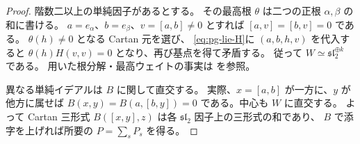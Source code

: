 \begin{proof}
階数二以上の単純因子があるとする。
その最高根 $\theta$ は二つの正根 $\alpha,\beta$ の和に書ける。
$a=e_\alpha$、$b=e_\beta$、$v=[a,b]\neq0$ とすれば
$[a,v]=[b,v]=0$ である。
$\theta(h)\neq0$ となる Cartan 元を選び、
\eqref{eq:pg-lie-H}に $(a,b,h,v)$ を代入すると
$\theta(h)H(v,v)=0$ となり、再び基点を得て矛盾する。
従って $W\simeq\mathfrak{sl}_2^{\oplus k}$ である。
用いた根分解・最高ウェイトの事実は
\cite[\S19.4, Theorem 25.17, \S32.2]{PEtingofLie}を参照。

異なる単純イデアルは $B$ に関して直交する。
実際、$x=[a,b]$ が一方に、$y$ が他方に属せば
$B(x,y)=B(a,[b,y])=0$ である。中心も $W$ に直交する。
よって Cartan 三形式 $B([x,y],z)$ は各 $\mathfrak{sl}_2$ 因子上の三形式の和であり、
$B$ で添字を上げれば所要の $P=\sum_sP_s$ を得る。
\end{proof}

